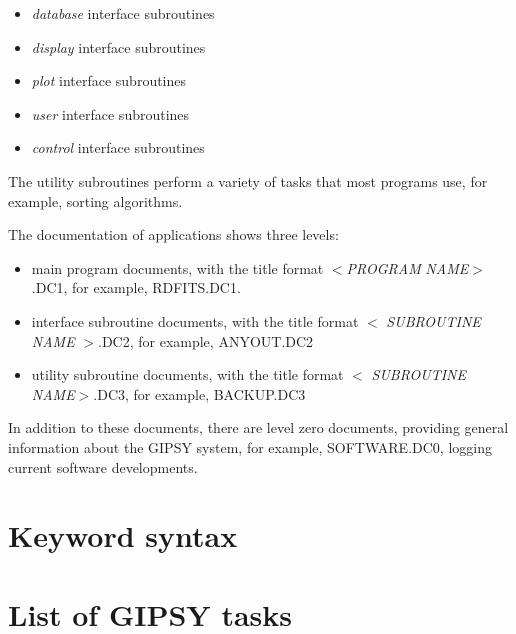 \begin{itemize}

\item {\em database} interface subroutines 

\item {\em display} interface subroutines

\item {\em plot} interface subroutines

\item {\em user} interface subroutines

\item {\em control} interface subroutines

\end{itemize}

The utility subroutines perform a variety of tasks that most programs
use, for example, sorting algorithms. 

The documentation of applications shows three levels:

\begin{itemize}

\item main program documents, with the title format $<${\em PROGRAM}
{\em NAME}$>$.DC1, for example, RDFITS.DC1. 

\item interface subroutine documents, with the title format $<${\em
SUBROUTINE} {\em NAME} $>$.DC2, for example, ANYOUT.DC2

\item utility subroutine documents, with the title format $<${\em
SUBROUTINE} {\em NAME}$>$.DC3, for example, BACKUP.DC3

\end{itemize}

In addition to these documents, there are level zero documents,
providing general information about the GIPSY system, for example,
SOFTWARE.DC0, logging current software developments. 

\appendix


\section{Keyword syntax}

\section{List of GIPSY tasks}


